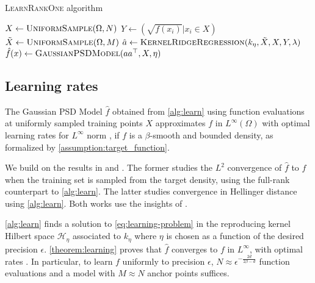 \begin{algorithm}[ht!]
\caption{\textsc{LearnRankOne} algorithm}\label{alg:learn}
{}
$X \gets \textsc{UniformSample}(\Omega, N)$\;  \BlankLine
$Y \gets (\sqrt{f(x_i)} \vert x_i \in X)$\;\BlankLine
$\tilde X\gets \textsc{UniformSample}(\Omega, M)$\;  \BlankLine
$\hat a \gets \textsc{KernelRidgeRegression}(k_\eta, \tilde X, X, Y, \lambda)$ \; \BlankLine
$\hat f(x) \gets \textsc{GaussianPSDModel}(aa^\top , X, \eta)$\;\BlankLine
{}
\end{algorithm}

\subsection{Learning rates}\label{sec:learning}
The Gaussian PSD Model $\hat f$ obtained from \cref{alg:learn} using function evaluations at uniformly sampled training points $X$ approximates $f$ in $L^\infty(\Omega)$ with optimal learning rates for $L^\infty$ norm \citep{wendland2004scattered}, if $f$ is a $\beta$-smooth and bounded density, as formalized by \cref{assumption:target_function}.

We build on the results in \cite{ciliberto2021} and \cite{sampling-ulysse}. The former studies the $L^2$ convergence of $\hat f$ to $f$ when the training set is sampled from the target density, using the full-rank counterpart to \cref{alg:learn}. The latter studies convergence in Hellinger distance using \cref{alg:learn}. Both works use the insights of \cite{less-is-more}.

\cref{alg:learn} finds a solution to \cref{eq:learning-problem} in the reproducing kernel Hilbert space $\mathcal H_\eta$ associated to $k_\eta$ where $\eta$ is chosen as a function of the desired precision $\epsilon$. \cref{theorem:learning} proves that $\hat f$ converges to $f$ in $L^\infty$, with optimal rates \citep{wendland2004scattered}. In particular, to learn $f$ uniformly to precision $\epsilon$, $N\approx\epsilon^{-\frac{2d}{2\beta -d}}$ function evaluations and a model with $M \approx N$ anchor points suffices.

